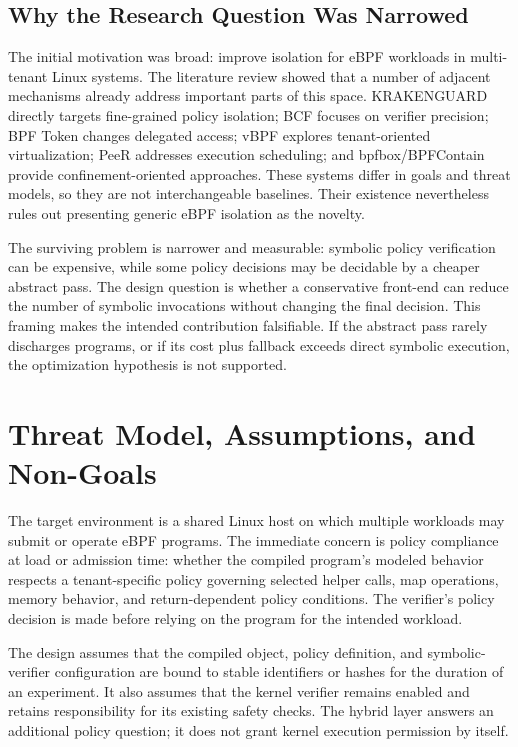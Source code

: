 \subsection{Why the Research Question Was Narrowed}
The initial motivation was broad: improve isolation for eBPF workloads in multi-tenant Linux systems. The literature review showed that a number of adjacent mechanisms already address important parts of this space. KRAKENGUARD directly targets fine-grained policy isolation; BCF focuses on verifier precision; BPF Token changes delegated access; vBPF explores tenant-oriented virtualization; PeeR addresses execution scheduling; and bpfbox/BPFContain provide confinement-oriented approaches. These systems differ in goals and threat models, so they are not interchangeable baselines. Their existence nevertheless rules out presenting generic eBPF isolation as the novelty.

The surviving problem is narrower and measurable: symbolic policy verification can be expensive, while some policy decisions may be decidable by a cheaper abstract pass. The design question is whether a conservative front-end can reduce the number of symbolic invocations without changing the final decision. This framing makes the intended contribution falsifiable. If the abstract pass rarely discharges programs, or if its cost plus fallback exceeds direct symbolic execution, the optimization hypothesis is not supported.

\section{Threat Model, Assumptions, and Non-Goals}
The target environment is a shared Linux host on which multiple workloads may submit or operate eBPF programs. The immediate concern is policy compliance at load or admission time: whether the compiled program's modeled behavior respects a tenant-specific policy governing selected helper calls, map operations, memory behavior, and return-dependent policy conditions. The verifier's policy decision is made before relying on the program for the intended workload.

The design assumes that the compiled object, policy definition, and symbolic-verifier configuration are bound to stable identifiers or hashes for the duration of an experiment. It also assumes that the kernel verifier remains enabled and retains responsibility for its existing safety checks. The hybrid layer answers an additional policy question; it does not grant kernel execution permission by itself.


